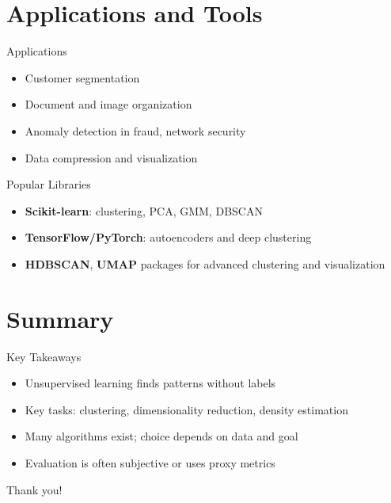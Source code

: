 \documentclass{beamer}
\begin{document}
\section{Applications and Tools}

\begin{frame}{Applications}
\begin{itemize}
    \item Customer segmentation
    \item Document and image organization
    \item Anomaly detection in fraud, network security
    \item Data compression and visualization
\end{itemize}
\end{frame}

\begin{frame}{Popular Libraries}
\begin{itemize}
    \item \textbf{Scikit-learn}: clustering, PCA, GMM, DBSCAN
    \item \textbf{TensorFlow/PyTorch}: autoencoders and deep clustering
    \item \textbf{HDBSCAN}, \textbf{UMAP} packages for advanced clustering and visualization
\end{itemize}
\end{frame}

\section{Summary}

\begin{frame}{Key Takeaways}
\begin{itemize}
    \item Unsupervised learning finds patterns without labels
    \item Key tasks: clustering, dimensionality reduction, density estimation
    \item Many algorithms exist; choice depends on data and goal
    \item Evaluation is often subjective or uses proxy metrics
\end{itemize}
\end{frame}

\begin{frame}[standout]
    Thank you!
\end{frame}
\end{document}
